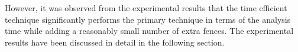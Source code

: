 However, it was observed from the experimental results that the time
efficient technique significantly performs the primary technique in terms of 
the analysis time while adding a reasonably small number of extra \sc
fences. The experimental results have been discussed in detail in the 
following section.